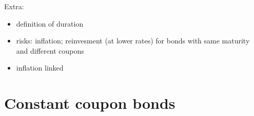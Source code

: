 \documentclass[letterpaper,10pt,english]{jupyterBook}
\begin{document}
\sphinxAtStartPar
Extra:
\begin{itemize}
\item {} 
\sphinxAtStartPar
definition of duration

\item {} 
\sphinxAtStartPar
risks: inflation; reinvesment (at lower rates) for bonds with same maturity and different coupons

\item {} 
\sphinxAtStartPar
inflation linked

\end{itemize}


\section{Constant coupon bonds}
\label{\detokenize{ch/assets/bonds:constant-coupon-bonds}}
\end{document}
